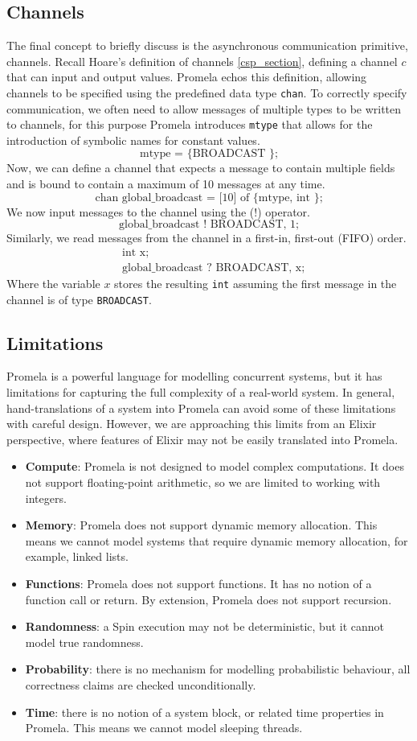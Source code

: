 \subsection{Channels}
The final concept to briefly discuss is the asynchronous communication primitive, channels. Recall Hoare's definition of channels \ref{csp_section}, defining a channel $c$ that can input and output values. Promela echos this definition, allowing channels to be specified using the predefined data type \texttt{chan}. To correctly specify communication, we often need to allow messages of multiple types to be written to channels, for this purpose Promela introduces \texttt{mtype} that allows for the introduction of symbolic names for constant values.
\[
\text{mtype = \{ BROADCAST \};}
\]
Now, we can define a channel that expects a message to contain multiple fields and is bound to contain a maximum of 10 messages at any time.
\[
\text{chan global\_broadcast = [10] of \{ mtype, int \};}
\]
We now input messages to the channel using the (!) operator.
\[
\text{global\_broadcast ! BROADCAST, 1;}
\]
Similarly, we read messages from the channel in a first-in, first-out (FIFO) order.
\[
\begin{aligned}
& \text{int x;} \\
& \text{global\_broadcast ? BROADCAST, x;}
\end{aligned}
\]
Where the variable $x$ stores the resulting \texttt{int} assuming the first message in the channel is of type \texttt{BROADCAST}.
\subsection{Limitations}
Promela is a powerful language for modelling concurrent systems, but it has limitations for capturing the full complexity of a real-world system. In general, hand-translations of a system into Promela can avoid some of these limitations with careful design. However, we are approaching this limits from an Elixir perspective, where features of Elixir may not be easily translated into Promela.
\begin{itemize}
    \item \textbf{Compute}: Promela is not designed to model complex computations. It does not support floating-point arithmetic, so we are limited to working with integers.
    \item \textbf{Memory}: Promela does not support dynamic memory allocation. This means we cannot model systems that require dynamic memory allocation, for example, linked lists.
    \item \textbf{Functions}: Promela does not support functions. It has no notion of a function call or return. By extension, Promela does not support recursion.
    \item \textbf{Randomness}: a Spin execution may not be deterministic, but it cannot model true randomness.
    \item \textbf{Probability}: there is no mechanism for modelling probabilistic behaviour, all correctness claims are checked unconditionally.
    \item \textbf{Time}: there is no notion of a system block, or related time properties in Promela. This means we cannot model sleeping threads.
\end{itemize}
